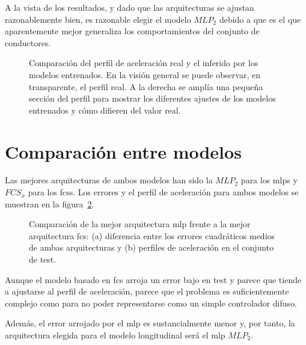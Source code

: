 A la vista de los resultados, y dado que las arquitecturas se ajustan razonablemente bien, es razonable elegir el modelo $MLP_2$ debido a que es el que aparentemente mejor generaliza los comportamientos del conjunto de conductores.

\begin{figure}
	\centering
	\qquad
	\caption[Comparación del perfil de aceleración real y el inferido por los modelos entrenados]{Comparación del perfil de aceleración real y el inferido por los modelos entrenados. En la visión general se puede observar, en transparente, el perfil real. A la derecha se amplía una pequeña sección del perfil para mostrar los diferentes ajustes de los modelos entrenados y cómo difieren del valor real.}
	\label{fig:cf-mlp-test-comparisons}
\end{figure}

\section{Comparación entre modelos}

Las mejores arquitecturas de ambos modelos han sido la $MLP_2$ para los \acp{mlp} y $FCS_x$ para los \acp{fcs}. Los errores y el perfil de aceleración para ambos modelos se muestran en la figura~\ref{fig:cf-comparison-between-best-mlp-and-fcs-architecture}.

\begin{figure}
	\centering
	\qquad
	\caption[Comparación entre los dos tipos de modelo longitudinal]{Comparación de la mejor arquitectura \ac{mlp} frente a la mejor arquitectura \ac{fcs}: (a) diferencia entre los errores cuadráticos medios de ambas arquitecturas y (b) perfiles de aceleración en el conjunto de test.}
	\label{fig:cf-comparison-between-best-mlp-and-fcs-architecture}
\end{figure}

Aunque el modelo basado en \ac{fcs} arroja un error bajo en test y parece que tiende a ajustarse al perfil de aceleración, parece que el problema es suficientemente complejo como para no poder representarse como un simple controlador difuso.

Además, el error arrojado por el \ac{mlp} es sustancialmente menor y, por tanto, la arquitectura elegida para el modelo longitudinal será el \ac{mlp} $MLP_2$.
